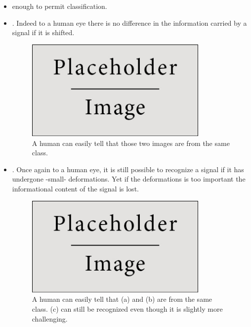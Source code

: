 \documentclass[a4paper,11pt]{report}
\begin{document}
      \begin{itemize}
				\item {} enough to permit classification.\\
	
				\item {}. Indeed to a human eye there is no difference in the information carried by a signal if it is shifted.\\
		
				\begin{figure}
				  \begin{center}
				    \includegraphics[width=3.5in]{placeholder.jpg}
				    \caption[Translation invariance]{A human can easily tell that those two images are from the same class.}
				    \label{fig:Illustration translation invariance}
				  \end{center}
				\end{figure}
	
				\item {}. Once again to a human eye, it is still possible to recognize a signal if it has undergone -small- deformations. Yet if the deformations is too important the informational content of the signal is lost.\\
				
				\begin{figure}
				  \begin{center}
				    \includegraphics[width=3.5in]{placeholder.jpg}
				    \caption[stability to deformations]{A human can easily tell that (a) and (b) are from the same class. (c) can still be recognized even though it is slightly more challenging.}
				    \label{fig:illustration stability deformations}
				  \end{center}
				\end{figure}
				

\end{itemize}
\end{document}
